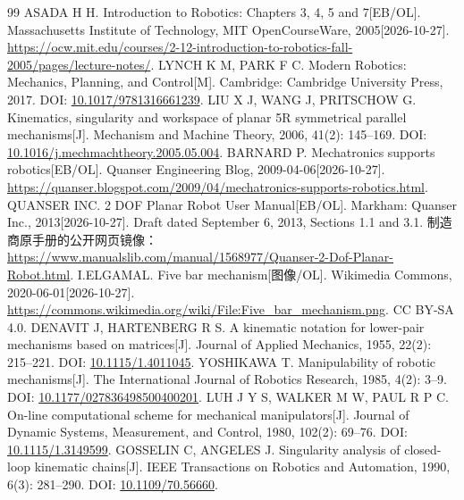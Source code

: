 \begingroup
\fontsize{10.5pt}{18pt}\selectfont
\begin{thebibliography}{99}
\setlength{\itemsep}{5pt}
 ASADA H H. Introduction to Robotics: Chapters 3, 4, 5 and 7[EB/OL]. Massachusetts Institute of Technology, MIT OpenCourseWare, 2005[2026-10-27]. \url{https://ocw.mit.edu/courses/2-12-introduction-to-robotics-fall-2005/pages/lecture-notes/}.
 LYNCH K M, PARK F C. Modern Robotics: Mechanics, Planning, and Control[M]. Cambridge: Cambridge University Press, 2017. DOI: \href{https://doi.org/10.1017/9781316661239}{10.1017/9781316661239}.
 LIU X J, WANG J, PRITSCHOW G. Kinematics, singularity and workspace of planar 5R symmetrical parallel mechanisms[J]. Mechanism and Machine Theory, 2006, 41(2): 145--169. DOI: \href{https://doi.org/10.1016/j.mechmachtheory.2005.05.004}{10.1016/j.mechmachtheory.2005.05.004}.
 BARNARD P. Mechatronics supports robotics[EB/OL]. Quanser Engineering Blog, 2009-04-06[2026-10-27]. \url{https://quanser.blogspot.com/2009/04/mechatronics-supports-robotics.html}.
 QUANSER INC. 2 DOF Planar Robot User Manual[EB/OL]. Markham: Quanser Inc., 2013[2026-10-27]. Draft dated September 6, 2013, Sections 1.1 and 3.1. 制造商原手册的公开网页镜像：\url{https://www.manualslib.com/manual/1568977/Quanser-2-Dof-Planar-Robot.html}.
 I.ELGAMAL. Five bar mechanism[图像/OL]. Wikimedia Commons, 2020-06-01[2026-10-27]. \url{https://commons.wikimedia.org/wiki/File:Five_bar_mechanism.png}. CC BY-SA 4.0.
 DENAVIT J, HARTENBERG R S. A kinematic notation for lower-pair mechanisms based on matrices[J]. Journal of Applied Mechanics, 1955, 22(2): 215--221. DOI: \href{https://doi.org/10.1115/1.4011045}{10.1115/1.4011045}.
 YOSHIKAWA T. Manipulability of robotic mechanisms[J]. The International Journal of Robotics Research, 1985, 4(2): 3--9. DOI: \href{https://doi.org/10.1177/027836498500400201}{10.1177/027836498500400201}.
 LUH J Y S, WALKER M W, PAUL R P C. On-line computational scheme for mechanical manipulators[J]. Journal of Dynamic Systems, Measurement, and Control, 1980, 102(2): 69--76. DOI: \href{https://doi.org/10.1115/1.3149599}{10.1115/1.3149599}.
 GOSSELIN C, ANGELES J. Singularity analysis of closed-loop kinematic chains[J]. IEEE Transactions on Robotics and Automation, 1990, 6(3): 281--290. DOI: \href{https://doi.org/10.1109/70.56660}{10.1109/70.56660}.
\end{thebibliography}
\endgroup

